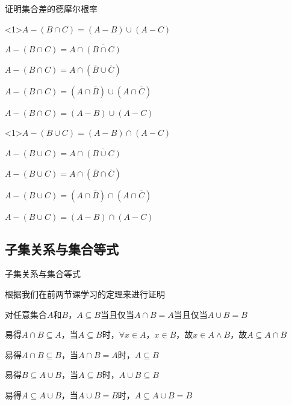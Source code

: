 \documentclass[xetex,10pt,aspectratio=43]{beamer}
\begin{document}
	\begin{frame}{证明集合差的德摩尔根率}
	
	\begin{block}{$A-(B\cap C)=(A-B)\cup(A-C)$}
	
	$A-(B\cap C)=A\cap\overline{(B\cap C)}$
	
	$A-(B\cap C)=A\cap(\overline{B}\cup\overline{C})$
	
	$A-(B\cap C)=(A\cap\overline{B})\cup(A\cap\overline{C})$

	$A-(B\cap C)=(A-B)\cup(A-C)$
	
	\end{block}
	
	\begin{block}{$A-(B\cup C)=(A-B)\cap(A-C)$}
	
	$A-(B\cup C)=A\cap\overline{(B\cup C)}$
	
	$A-(B\cup C)=A\cap(\overline{B}\cap\overline{C})$
	
	$A-(B\cup C)=(A\cap\overline{B})\cap(A\cap\overline{C})$
	
	$A-(B\cup C)=(A-B)\cap(A-C)$
		
	\end{block}

	\end{frame}
	
	\subsection{子集关系与集合等式}
	
	\begin{frame}{子集关系与集合等式}
		
	根据我们在前两节课学习的定理来进行证明
		
	\end{frame}

	\begin{frame}{对任意集合$A$和$B$，$A\subseteq B$当且仅当$A\cap B=A$当且仅当$A\cup B=B$}
	
	易得$A\cap B\subseteq A$，当$A\subseteq B$时，$\forall x\in A$，$x\in B$，故$x\in A\wedge B$，故$A\subseteq A\cap B$
	
	易得$A\cap B\subseteq B$，当$A\cap B=A$时，$A\subseteq B$
	
	易得$B\subseteq A\cup B$，当$A\subseteq B$时，$A\cup B\subseteq B$
	
	易得$A\subseteq A\cup B$，当$A\cup B=B$时，$A\subseteq A\cup B=B$
	
	\end{frame}
\end{document}
